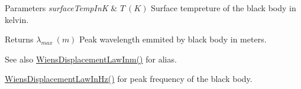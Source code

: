 \begin{DoxyParams}{Parameters}
{\em surface\+Temp\+InK} & $T\ (K)$ Surface tempreture of the black body in kelvin. \\
\hline
\end{DoxyParams}
\begin{DoxyReturn}{Returns}
$\lambda_{max}\ (m)$ Peak wavelength emmited by black body in meters. 
\end{DoxyReturn}
\begin{DoxySeeAlso}{See also}
\mbox{\hyperlink{group___e_g_x_phys-_electrodynamics-_black_body-_wiens_displacement_law_ga126ebb146c31a2371f1d1d001d11c62f}{Wiens\+Displacement\+Law\+Inm()}} for alias. 

\mbox{\hyperlink{group___e_g_x_phys-_electrodynamics-_black_body-_wiens_displacement_law_gaf09ffbc9b7133c16da786c1609ecf689}{Wiens\+Displacement\+Law\+In\+Hz()}} for peak frequency of the black body. 
\end{DoxySeeAlso}

